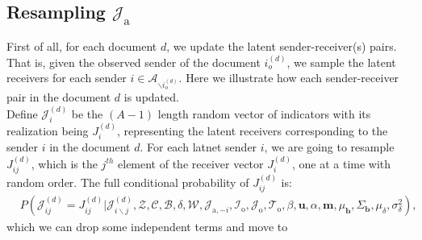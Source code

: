 \documentclass[a4paper]{article}
\begin{document}
    \subsection{Resampling $\mathcal{J}_{\mbox{a}}$} \label{subsec: Data augmentation}
      First of all, for each document $d$, we update the latent sender-receiver(s) pairs. That is, given the observed sender of the document $i_o^{(d)}$, we sample the latent receivers for each sender $i \in \mathcal{A}_{\backslash i_o^{(d)}}$. Here we illustrate how each sender-receiver pair in the document $d$ is updated.\\\newline
       Define ${\mathcal{J}}^{(d)}_{i}$ be the $(A-1)$ length random vector of indicators with its realization being $J^{(d)}_{i}$, representing the latent receivers corresponding to the sender $i$ in the document $d$. For each latnet sender $i$, we are going to resample ${J}^{(d)}_{ij}$, which is the $j^{th}$ element of the receiver vector ${J}^{(d)}_{i}$, one at a time with random order. The full conditional probability of ${J}^{(d)}_{ij}$ is:
       \begin{equation}
       \begin{aligned}
      & P(\mathcal{J}^{(d)}_{ij} = {J}^{(d)}_{ij}|\mathcal{J}^{(d)}_{i\backslash j}, \mathcal{Z}, \mathcal{C},   \mathcal{B}, \delta, \mathcal{W},  \mathcal{J}_{\mbox{a}, -i}, \mathcal{I}_{\mbox{o}}, \mathcal{J}_{\mbox{o}}, \mathcal{T}_{\mbox{o}}, \beta, \boldsymbol{u}, \alpha, \boldsymbol{m},  \mu_{\boldsymbol{b}}, \Sigma_{\boldsymbol{b}}, \mu_\delta, \sigma^2_\delta),
              \end{aligned}
       \end{equation}
       which we can drop some independent terms and move to 
\end{document}
